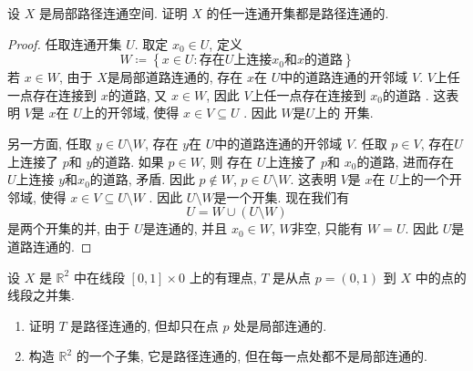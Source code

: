 \documentclass[../main.tex]{subfiles}
\begin{document}
\begin{exercise}{}{}
设 $X$ 是局部路径连通空间. 证明 $X$ 的任一连通开集都是路径连通的.
\end{exercise}
\begin{proof}
    任取连通开集 \(  U  \). 取定 \(  x_0 \in U  \), 定义 \[
    W\coloneqq \left\{ x\in U: \text{存在}U\text{上连接}x_0\text{和}x\text{的道路} \right\}
    \]  若 \(  x \in W  \), 由于 \(  X  \)是局部道路连通的, 存在 \(  x  \)在 \(  U  \)中的道路连通的开邻域 \(  V  \). \(  V  \)上任一点存在连接到 \(  x  \)的道路, 又 \(  x \in W  \), 因此 \(  V  \)上任一点存在连接到 \(  x_0  \)的道路     . 这表明 \(  V  \)是 \(  x  \)在 \(  U \)上的开邻域, 使得 \(  x \in V\subseteq U  \) .   因此 \(  W  \)是\(  U  \)上的 开集.      
    
    另一方面, 任取 \(  y \in U\setminus W  \), 存在 \(  y  \)在 \(  U  \)中的道路连通的开邻域 \(  V  \). 任取 \(  p\in V  \), 存在\(  U  \)上连接了 \(  p  \)和 \(  y  \)的道路. 如果 \(   p \in W  \), 则    存在 \(  U  \)上连接了 \(  p  \)和 \(  x_0  \)的道路,           进而存在 \(  U  \)上连接 \(  y  \)和\(  x_0  \)的道路, 矛盾. 因此 \(  p\not \in W  \), \(  p \in U\setminus W  \). 这表明 \(  V  \)是 \(  x \)在 \(  U \)上的一个开邻域, 使得 \(  x \in V\subseteq U\setminus W  \) . 因此 \(  U\setminus W  \)是一个开集. 现在我们有 \[
    U= W\cup \left( U\setminus W \right) 
    \]是两个开集的并, 由于 \(  U  \)是连通的, 并且 \(  x_0 \in W  \), \(  W  \)非空, 只能有 \(  W= U  \). 因此 \(  U  \)是道路连通的.                        
\end{proof}
\begin{exercise}{}{}
 设 $X$ 是 $\mathbb{R}^2$ 中在线段 $[0,1] \times 0$ 上的有理点, $T$ 是从点 $p=(0,1)$ 到 $X$ 中的点的线段之并集.
\begin{enumerate}
    \item 证明 $T$ 是路径连通的, 但却只在点 $p$ 处是局部连通的.
    \item 构造 $\mathbb{R}^2$ 的一个子集, 它是路径连通的, 但在每一点处都不是局部连通的.
\end{enumerate}
\end{exercise}
\end{document}
